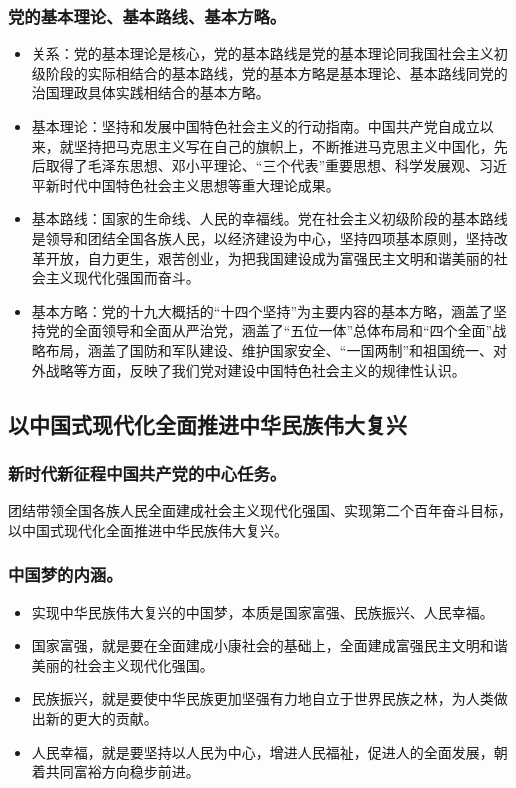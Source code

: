 \documentclass{article}
\begin{document}
\subsubsection{党的基本理论、基本路线、基本方略。}
\begin{itemize}
    \item 关系：党的基本理论是核心，党的基本路线是党的基本理论同我国社会主义初级阶段的实际相结合的基本路线，党的基本方略是基本理论、基本路线同党的治国理政具体实践相结合的基本方略。
    \item 基本理论：坚持和发展中国特色社会主义的行动指南。中国共产党自成立以来，就坚持把马克思主义写在自己的旗帜上，不断推进马克思主义中国化，先后取得了毛泽东思想、邓小平理论、“三个代表”重要思想、科学发展观、习近平新时代中国特色社会主义思想等重大理论成果。
    \item 基本路线：国家的生命线、人民的幸福线。党在社会主义初级阶段的基本路线是领导和团结全国各族人民，以经济建设为中心，坚持四项基本原则，坚持改革开放，自力更生，艰苦创业，为把我国建设成为富强民主文明和谐美丽的社会主义现代化强国而奋斗。
    \item 基本方略：党的十九大概括的“十四个坚持”为主要内容的基本方略，涵盖了坚持党的全面领导和全面从严治党，涵盖了“五位一体”总体布局和“四个全面”战略布局，涵盖了国防和军队建设、维护国家安全、“一国两制”和祖国统一、对外战略等方面，反映了我们党对建设中国特色社会主义的规律性认识。
\end{itemize}

\subsection{以中国式现代化全面推进中华民族伟大复兴}

\subsubsection{新时代新征程中国共产党的中心任务。}
团结带领全国各族人民全面建成社会主义现代化强国、实现第二个百年奋斗目标，以中国式现代化全面推进中华民族伟大复兴。

\subsubsection{中国梦的内涵。}
\begin{itemize}
    \item 实现中华民族伟大复兴的中国梦，本质是国家富强、民族振兴、人民幸福。
    \item 国家富强，就是要在全面建成小康社会的基础上，全面建成富强民主文明和谐美丽的社会主义现代化强国。
    \item 民族振兴，就是要使中华民族更加坚强有力地自立于世界民族之林，为人类做出新的更大的贡献。
    \item 人民幸福，就是要坚持以人民为中心，增进人民福祉，促进人的全面发展，朝着共同富裕方向稳步前进。
\end{itemize}
\end{document}
